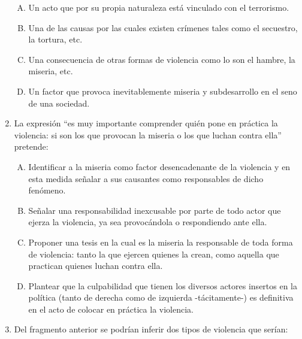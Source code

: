 \begin{enumerate}
\begin{enumerate}[(A)]
\item   Un acto que por su propia naturaleza está vinculado con el terrorismo.
 \item  Una de las causas por las cuales existen crímenes tales como el secuestro, la tortura, etc.
\item Una consecuencia de otras formas de violencia como lo son el hambre, la miseria, etc.
\item Un factor que provoca inevitablemente miseria y subdesarrollo en el seno de una sociedad.
\end{enumerate}




\item  La expresión ``es muy importante comprender quién pone en práctica la violencia: si son los que provocan la miseria o los que luchan contra ella'' pretende:\label{sociii-8}


\begin{enumerate}[(A)]
\item   Identificar a la miseria como factor desencadenante de la violencia y en esta medida señalar a sus causantes como responsables de dicho fenómeno.
 \item  Señalar una responsabilidad inexcusable por parte de todo actor que ejerza la violencia, ya sea provocándola o respondiendo ante ella.
\item Proponer una  tesis en la cual es la miseria la responsable de toda forma de violencia: tanto la que ejercen quienes la crean, como aquella que practican quienes luchan contra ella.
\item Plantear que la culpabilidad que tienen los diversos actores insertos en la política (tanto de derecha como de izquierda -tácitamente-) es definitiva en el acto de colocar en práctica la violencia.  
\end{enumerate}

\newpage


\item Del fragmento anterior se podrían inferir dos tipos de violencia que serían:\label{sociii-7}



\end{enumerate}
